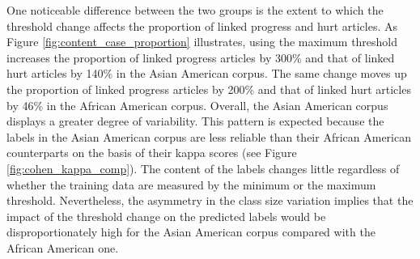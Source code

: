 \documentclass[12 pt]{article}
\begin{document}
One noticeable difference between the two groups is the extent to which the threshold change affects the proportion of linked progress and hurt articles. As Figure \ref{fig:content_case_proportion} illustrates, using the maximum threshold increases the proportion of linked progress articles by 300\% and that of linked hurt articles by 140\% in the Asian American corpus. The same change moves up the proportion of linked progress articles by 200\% and that of linked hurt articles by 46\% in the African American corpus. Overall, the Asian American corpus displays a greater degree of variability. This pattern is expected because the labels in the Asian American corpus are less reliable than their African American counterparts on the basis of their kappa scores (see Figure \ref{fig:cohen_kappa_comp}). The content of the labels changes little regardless of whether the training data are measured by the minimum or the maximum threshold. Nevertheless, the asymmetry in the class size variation implies that the impact of the threshold change on the predicted labels would be disproportionately high for the Asian American corpus compared with the African American one.
\end{document}
